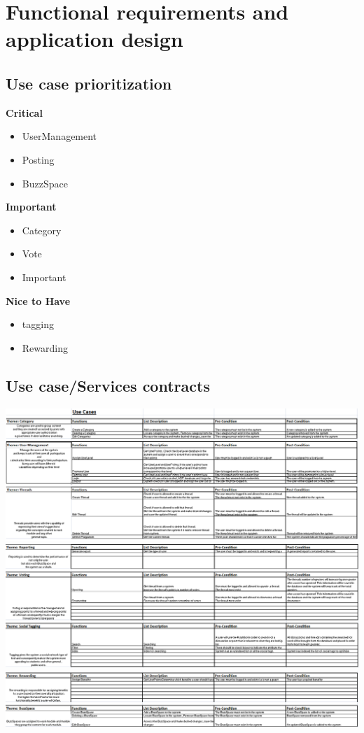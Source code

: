 \documentclass[a4paper,12pt]{report}
\begin{document}
\newpage
\section{Functional requirements and application design}

\subsection{Use case prioritization}

\textbf{Critical}
\begin{itemize}
	\item UserManagement
	\item Posting
	\item BuzzSpace
\end{itemize}

\textbf{Important}
\begin{itemize}
	\item Category
	\item Vote
	\item Important
\end{itemize}

\textbf{Nice to Have}
\begin{itemize}
	\item tagging
	\item Rewarding
\end{itemize}

\subsection{Use case/Services contracts}
\includegraphics[width=1\textwidth]{./Use_case_A.png}\\[0.4cm]
\includegraphics[width=1\textwidth]{./Use_case_B.png}\\[0.4cm] 
\includegraphics[width=1\textwidth]{./Use_case_C.png}\\[0.4cm]
\end{document}
